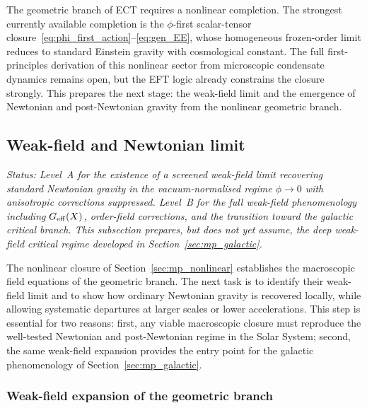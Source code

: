 The geometric branch of ECT requires a nonlinear completion.
The strongest currently available completion is the $\phi$-first
scalar-tensor closure~\eqref{eq:phi_first_action}--\eqref{eq:gen_EE},
whose homogeneous frozen-order limit reduces to standard Einstein
gravity with cosmological constant.
The full first-principles derivation of this nonlinear sector from
microscopic condensate dynamics remains open, but the EFT logic already
constrains the closure strongly.
This prepares the next stage: the weak-field limit and the emergence of
Newtonian and post-Newtonian gravity from the nonlinear geometric branch.


\subsection{Weak-field and Newtonian limit}
\label{sec:mp_newtonian}

\textit{Status: Level~A for the existence of a screened weak-field limit
recovering standard Newtonian gravity in the vacuum-normalised regime
$\phi\to 0$ with anisotropic corrections suppressed.
Level~B for the full weak-field phenomenology including $G_{\rm eff}(X)$,
order-field corrections, and the transition toward the galactic critical
branch.
This subsection prepares, but does not yet assume, the deep weak-field
critical regime developed in Section~\ref{sec:mp_galactic}.}

\medskip
The nonlinear closure of Section~\ref{sec:mp_nonlinear} establishes the
macroscopic field equations of the geometric branch.
The next task is to identify their weak-field limit and to show how
ordinary Newtonian gravity is recovered locally, while allowing
systematic departures at larger scales or lower accelerations.
This step is essential for two reasons: first, any viable macroscopic
closure must reproduce the well-tested Newtonian and post-Newtonian
regime in the Solar System; second, the same weak-field expansion
provides the entry point for the galactic phenomenology of
Section~\ref{sec:mp_galactic}.

\subsubsection*{Weak-field expansion of the geometric branch}

